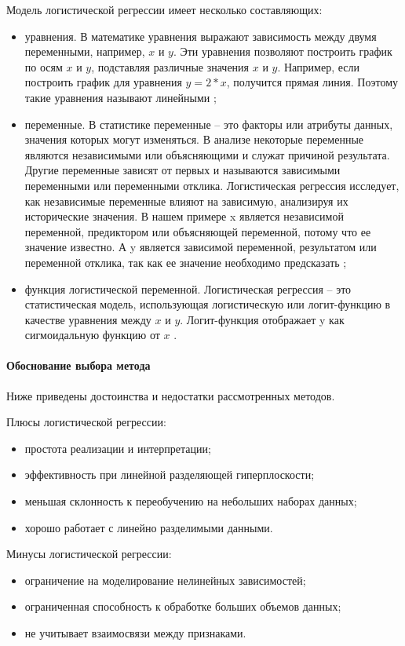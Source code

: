 Модель логистической регрессии имеет несколько составляющих:
\begin{itemize}
    \item уравнения. В математике уравнения выражают зависимость между двумя переменными, например, $x$ и $y$. Эти уравнения позволяют построить график по осям $x$ и $y$, подставляя различные значения $x$ и $y$. Например, если построить график для уравнения $y = 2 * x$, получится прямая линия. Поэтому такие уравнения называют линейными ;
    \item переменные. В статистике переменные – это факторы или атрибуты данных, значения которых могут изменяться. В анализе некоторые переменные являются независимыми или объясняющими и служат причиной результата. Другие переменные зависят от первых и называются зависимыми переменными или переменными отклика. Логистическая регрессия исследует, как независимые переменные влияют на зависимую, анализируя их исторические значения. В нашем примере x является независимой переменной, предиктором или объясняющей переменной, потому что ее значение известно. А y является зависимой переменной, результатом или переменной отклика, так как ее значение необходимо предсказать ;
    \item функция логистической переменной. Логистическая регрессия – это статистическая модель, использующая логистическую или логит-функцию в качестве уравнения между $x$ и $y$. Логит-функция отображает y как сигмоидальную функцию от $x$ .
\end{itemize}

\paragraph{Обоснование выбора метода}

Ниже приведены достоинства и недостатки рассмотренных методов.

Плюсы логистической регрессии:
\begin{itemize}
    \item простота реализации и интерпретации;
    \item эффективность при линейной разделяющей гиперплоскости;
    \item меньшая склонность к переобучению на небольших наборах данных;
    \item хорошо работает с линейно разделимыми данными.
\end{itemize}

Минусы логистической регрессии:
\begin{itemize}
    \item ограничение на моделирование нелинейных зависимостей;
    \item ограниченная способность к обработке больших объемов данных;
    \item не учитывает взаимосвязи между признаками.
\end{itemize}


